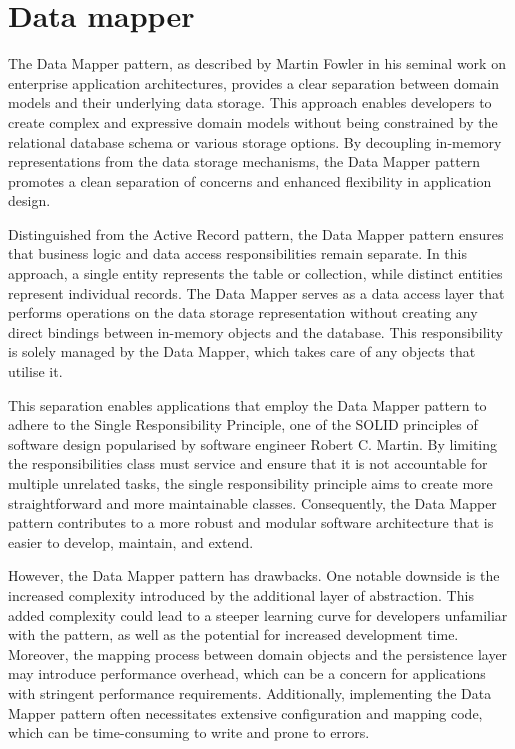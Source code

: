 \section{Data mapper}
The Data Mapper pattern, as described by Martin Fowler in his seminal work on enterprise application architectures, provides a clear separation between domain models and their underlying data storage. This approach enables developers to create complex and expressive domain models without being constrained by the relational database schema or various storage options. By decoupling in-memory representations from the data storage mechanisms, the Data Mapper pattern promotes a clean separation of concerns and enhanced flexibility in application design.\par
Distinguished from the Active Record pattern, the Data Mapper pattern ensures that business logic and data access responsibilities remain separate. In this approach, a single entity represents the table or collection, while distinct entities represent individual records. The Data Mapper serves as a data access layer that performs operations on the data storage representation without creating any direct bindings between in-memory objects and the database. This responsibility is solely managed by the Data Mapper, which takes care of any objects that utilise it.\par
This separation enables applications that employ the Data Mapper pattern to adhere to the Single Responsibility Principle, one of the SOLID principles of software design popularised by software engineer Robert C. Martin. By limiting the responsibilities class must service and ensure that it is not accountable for multiple unrelated tasks, the single responsibility principle aims to create more straightforward and more maintainable classes. Consequently, the Data Mapper pattern contributes to a more robust and modular software architecture that is easier to develop, maintain, and extend.\par
However, the Data Mapper pattern has drawbacks. One notable downside is the increased complexity introduced by the additional layer of abstraction. This added complexity could lead to a steeper learning curve for developers unfamiliar with the pattern, as well as the potential for increased development time. Moreover, the mapping process between domain objects and the persistence layer may introduce performance overhead, which can be a concern for applications with stringent performance requirements. Additionally, implementing the Data Mapper pattern often necessitates extensive configuration and mapping code, which can be time-consuming to write and prone to errors.\par

